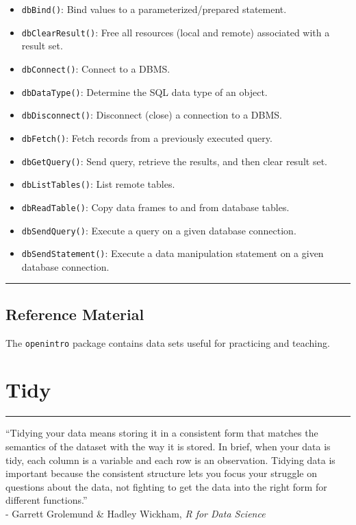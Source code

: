 \documentclass[]{book}
\providecommand{\tightlist}{%
  \setlength{\itemsep}{0pt}\setlength{\parskip}{0pt}}
\theoremstyle{definition}
\theoremstyle{definition}
\theoremstyle{definition}
\theoremstyle{remark}
\begin{document}
\begin{itemize}
\tightlist
\item
  \texttt{dbBind()}: Bind values to a parameterized/prepared statement.
\item
  \texttt{dbClearResult()}: Free all resources (local and remote)
  associated with a result set.
\item
  \texttt{dbConnect()}: Connect to a DBMS.
\item
  \texttt{dbDataType()}: Determine the SQL data type of an object.
\item
  \texttt{dbDisconnect()}: Disconnect (close) a connection to a DBMS.
\item
  \texttt{dbFetch()}: Fetch records from a previously executed query.
\item
  \texttt{dbGetQuery()}: Send query, retrieve the results, and then
  clear result set.
\item
  \texttt{dbListTables()}: List remote tables.
\item
  \texttt{dbReadTable()}: Copy data frames to and from database tables.
\item
  \texttt{dbSendQuery()}: Execute a query on a given database
  connection.
\item
  \texttt{dbSendStatement()}: Execute a data manipulation statement on a
  given database connection.
\end{itemize}

\begin{center}\rule{0.5\linewidth}{\linethickness}\end{center}

\section{Reference Material}\label{reference-material}

The \texttt{openintro} package contains data sets useful for practicing
and teaching.

\chapter{Tidy}\label{tidy}

\begin{center}\rule{0.5\linewidth}{\linethickness}\end{center}

``Tidying your data means storing it in a consistent form that matches
the semantics of the dataset with the way it is stored. In brief, when
your data is tidy, each column is a variable and each row is an
observation. Tidying data is important because the consistent structure
lets you focus your struggle on questions about the data, not fighting
to get the data into the right form for different functions.''\\
- Garrett Grolemund \& Hadley Wickham, \emph{R for Data Science}
\end{document}
